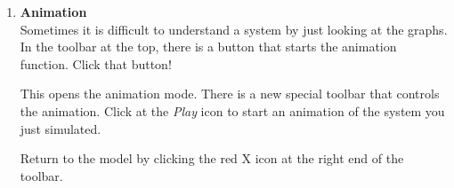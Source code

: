 \documentclass[a4paper,pdftex]{article}
\begin{document}
\begin{enumerate}
\item \textbf{Animation} \\
Sometimes it is difficult to understand a system by just looking at the graphs.
In the toolbar at the top, there is a button that starts the animation function.
Click that button!


This opens the animation mode.
There is a new special toolbar that controls the animation.
Click at the \textit{Play} icon to start an animation of the system you just simulated. 


Return to the model by clicking the red X icon at the right end of the toolbar.
\end{enumerate}
\end{document}
